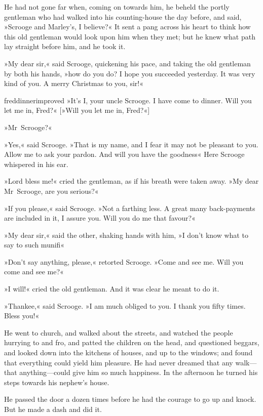 He had not gone far when, coming on towards him, he beheld the portly gentleman who had walked into his counting-house the day before, and said, »Scrooge and Marley's, I believe?« It sent a pang across his heart to think how this old gentleman would look upon him when they met; but he knew what path lay straight before him, and he took it.

»My dear sir,« said Scrooge, quickening his pace, and taking the old gentleman by both his hands, »how do you do? I hope you succeeded yesterday. It was very kind of you. A merry Christmas to you, sir!«

\begin{colorbigpic}
	[\smallpicsize]
	{freddinnerimproved}
	{»It's I, your uncle Scrooge. I have come to dinner. Will you let me in, Fred?«}
	[»Will you let me in, Fred?«]
\end{colorbigpic}


»Mr~Scrooge?«

»Yes,« said Scrooge. »That is my name, and I fear it may not be pleasant to you. Allow me to ask your pardon. And will you have the goodness\longdash« Here Scrooge whispered in his ear.

»Lord bless me!« cried the gentleman, as if his breath were taken away. »My dear Mr~Scrooge, are you serious?«

»If you please,« said Scrooge. »Not a farthing less. A great many back-payments are included in it, I assure you. Will you do me that favour?«

»My dear sir,« said the other, shaking hands with him, »I don't know what to say to such munifi\longdash«

»Don't say anything, please,« retorted Scrooge. »Come and see me. Will you come and see me?«

»I will!« cried the old gentleman. And it was clear he meant to do it.

»Thankee,« said Scrooge. »I am much obliged to you. I thank you fifty times. Bless you!«

He went to church, and walked about the streets, and watched the people hurrying to and fro, and patted the children on the head, and questioned beggars, and looked down into the kitchens of houses, and up to the windows; and found that everything could yield him pleasure. He had never dreamed that any walk---that anything---could give him so much happiness. In the afternoon he turned his steps towards his nephew's house.

He passed the door a dozen times before he had the courage to go up and knock. But he made a dash and did it.

